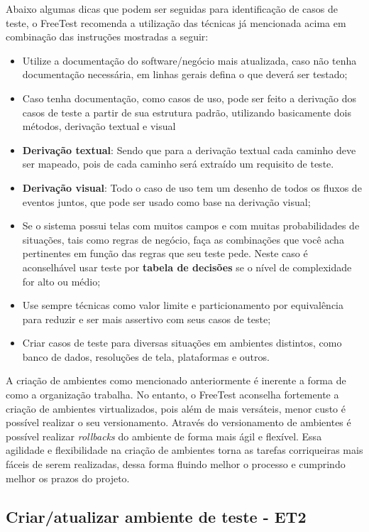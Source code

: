 Abaixo algumas dicas que podem ser seguidas para identificação de casos de teste, o FreeTest recomenda a utilização das técnicas já mencionada acima em combinação das instruções mostradas a seguir:

\begin{itemize}
    \item Utilize a documentação do software/negócio mais atualizada, caso não tenha documentação necessária, em linhas gerais defina o que deverá ser testado;
    \item Caso tenha documentação, como casos de uso, pode ser feito a derivação dos casos de teste a partir de sua estrutura padrão, utilizando basicamente dois métodos, derivação textual e visual
    \item \textbf{Derivação textual}: Sendo que para a derivação textual cada caminho deve ser mapeado, pois de cada caminho será extraído um requisito de teste.
    \item \textbf{Derivação visual}: Todo o caso de uso tem um desenho de todos os fluxos de eventos juntos, que pode ser usado como base na derivação visual;
    \item Se o sistema possui telas com muitos campos e com muitas probabilidades de situações, tais como regras de negócio, faça as combinações que você acha pertinentes em função das regras que seu teste pede. Neste caso é aconselhável usar teste por \textbf{tabela de decisões} se o nível de complexidade for alto ou médio;
    \item Use sempre técnicas como valor limite e particionamento por equivalência para reduzir e ser mais assertivo com seus casos de teste;
    \item Criar casos de teste para diversas situações em ambientes distintos, como banco de dados, resoluções de tela, plataformas e outros.
\end{itemize}

A criação de ambientes como mencionado anteriormente é inerente a forma de como a organização trabalha. No entanto, o FreeTest aconselha fortemente a criação de ambientes virtualizados, pois além de mais versáteis, menor custo é possível realizar o seu versionamento. Através do versionamento de ambientes é possível realizar \textit{rollbacks} do ambiente de forma mais ágil e flexível. Essa agilidade e flexibilidade na criação de ambientes torna as tarefas corriqueiras mais fáceis de serem realizadas, dessa forma fluindo melhor o processo e cumprindo melhor os prazos do projeto.

\subsection{Criar/atualizar ambiente de teste - ET2}
\label{sec:guiaet2}

